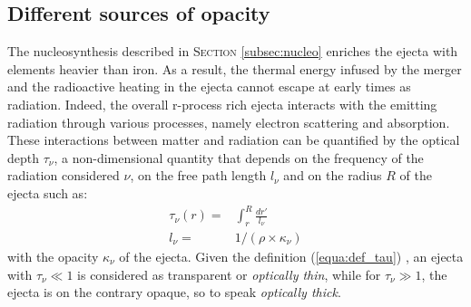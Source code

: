 \documentclass[a4paper, twoside, 11pt]{article}
\numberwithin{equation}{section}
\begin{document}
\subsection{Different sources of opacity}
\label{subsec:opac}

\hspace{\parindent}The nucleosynthesis described in S\textsc{ection} \ref{subsec:nucleo} enriches the ejecta with elements heavier than iron. As a result, the thermal energy infused by the merger and the radioactive heating in the ejecta cannot escape at early times as radiation. Indeed, the overall r-process rich ejecta interacts with the emitting radiation through various processes, namely electron scattering and absorption. \\

These interactions between matter and radiation can be quantified by the optical depth $\tau_{\nu}$, a non-dimensional quantity that depends on the frequency of the radiation considered $\nu$, on the free path length $l_{\nu}$ and on the radius $R$ of the ejecta such as: 
\begin{subequations}
\label{equa:tau_et_meanPath}
\begin{align}
\tau_\nu (r) =&  \int_{r}^R \frac{dr'}{l_\nu}  \label{equa:def_tau} \\
 l_{\nu} =& 1/(\rho \times \kappa_\nu)
 \label{equa:def_freePath} 
\end{align}
\end{subequations}
with the opacity $\kappa_{\nu} $ of the ejecta. 
Given the definition (\ref{equa:def_tau}) , an ejecta with $\tau_\nu\ll 1$ is considered as transparent or {\itshape{optically thin}}, while for $\tau_\nu\gg 1$, the ejecta is on the contrary opaque, so to speak {\itshape{optically thick}}.\\
\end{document}
